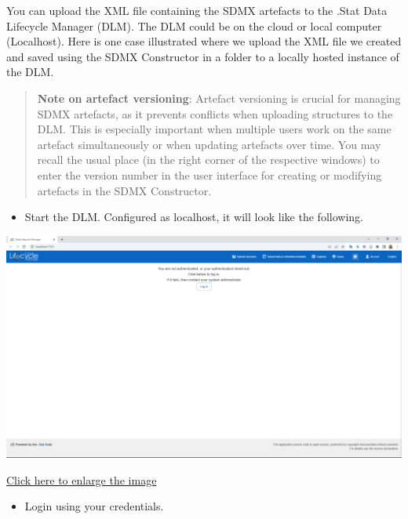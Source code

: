 \documentclass[
]{book}
\providecommand{\tightlist}{%
  \setlength{\itemsep}{0pt}\setlength{\parskip}{0pt}}
\begin{document}
You can upload the XML file containing the SDMX artefacts to the .Stat Data Lifecycle Manager (DLM). The DLM could be on the cloud or local computer (Localhost). Here is one case illustrated where we upload the XML file we created and saved using the SDMX Constructor in a folder to a locally hosted instance of the DLM.

\begin{quote}
\textbf{Note on artefact versioning}: Artefact versioning is crucial for managing SDMX artefacts, as it prevents conflicts when uploading structures to the DLM. This is especially important when multiple users work on the same artefact simultaneously or when updating artefacts over time. You may recall the usual place (in the right corner of the respective windows) to enter the version number in the user interface for creating or modifying artefacts in the SDMX Constructor.
\end{quote}

\begin{itemize}
\tightlist
\item
  Start the DLM. Configured as localhost, it will look like the following.
\end{itemize}

\begin{center}\includegraphics[width=1\linewidth]{./images/image188} \end{center}

\href{images/image188.png}{Click here to enlarge the image}

\begin{itemize}
\tightlist
\item
  Login using your credentials.
\end{itemize}
\end{document}
